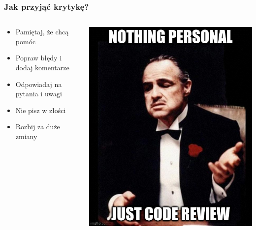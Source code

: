 \documentclass[xcolor=dvipsnames]{beamer}%
\begin{document}
\begin{frame}
	\frametitle{Jak przyjąć krytykę?}
	\begin{columns}
		\begin{column}{0.5\textwidth}
			\begin{itemize}
				\item Pamiętaj, że chcą pomóc
				\item Popraw błędy i dodaj komentarze
				\item Odpowiadaj na pytania i uwagi
				\item Nie pisz w złości
				\item Rozbij za duże zmiany
			\end{itemize}
		\end{column}
		\begin{column}{0.5\textwidth}
			\includegraphics[width=\textwidth,height=0.8\textheight,keepaspectratio]{figure/nic_osobistego.jpg}
		\end{column}
	\end{columns}
\end{frame}
\end{document}
